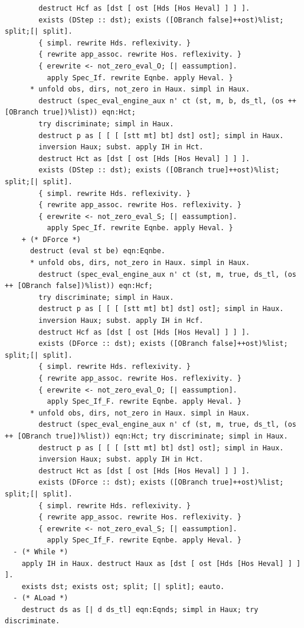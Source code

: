 \documentclass[12pt]{report}
\begin{document}
\begin{verbatim}
        destruct Hcf as [dst [ ost [Hds [Hos Heval] ] ] ].
        exists (DStep :: dst); exists ([OBranch false]++ost)%list; split;[| split].
        { simpl. rewrite Hds. reflexivity. }
        { rewrite app_assoc. rewrite Hos. reflexivity. }
        { erewrite <- not_zero_eval_O; [| eassumption].
          apply Spec_If. rewrite Eqnbe. apply Heval. }
      * unfold obs, dirs, not_zero in Haux. simpl in Haux.
        destruct (spec_eval_engine_aux n' ct (st, m, b, ds_tl, (os ++ [OBranch true])%list)) eqn:Hct;
        try discriminate; simpl in Haux.
        destruct p as [ [ [ [stt mt] bt] dst] ost]; simpl in Haux.
        inversion Haux; subst. apply IH in Hct.
        destruct Hct as [dst [ ost [Hds [Hos Heval] ] ] ].
        exists (DStep :: dst); exists ([OBranch true]++ost)%list; split;[| split].
        { simpl. rewrite Hds. reflexivity. }
        { rewrite app_assoc. rewrite Hos. reflexivity. }
        { erewrite <- not_zero_eval_S; [| eassumption].
          apply Spec_If. rewrite Eqnbe. apply Heval. }
    + (* DForce *)
      destruct (eval st be) eqn:Eqnbe.
      * unfold obs, dirs, not_zero in Haux. simpl in Haux.
        destruct (spec_eval_engine_aux n' ct (st, m, true, ds_tl, (os ++ [OBranch false])%list)) eqn:Hcf;
        try discriminate; simpl in Haux.
        destruct p as [ [ [ [stt mt] bt] dst] ost]; simpl in Haux.
        inversion Haux; subst. apply IH in Hcf.
        destruct Hcf as [dst [ ost [Hds [Hos Heval] ] ] ].
        exists (DForce :: dst); exists ([OBranch false]++ost)%list; split;[| split].
        { simpl. rewrite Hds. reflexivity. }
        { rewrite app_assoc. rewrite Hos. reflexivity. }
        { erewrite <- not_zero_eval_O; [| eassumption].
          apply Spec_If_F. rewrite Eqnbe. apply Heval. }
      * unfold obs, dirs, not_zero in Haux. simpl in Haux.
        destruct (spec_eval_engine_aux n' cf (st, m, true, ds_tl, (os ++ [OBranch true])%list)) eqn:Hct; try discriminate; simpl in Haux.
        destruct p as [ [ [ [stt mt] bt] dst] ost]; simpl in Haux.
        inversion Haux; subst. apply IH in Hct.
        destruct Hct as [dst [ ost [Hds [Hos Heval] ] ] ].
        exists (DForce :: dst); exists ([OBranch true]++ost)%list; split;[| split].
        { simpl. rewrite Hds. reflexivity. }
        { rewrite app_assoc. rewrite Hos. reflexivity. }
        { erewrite <- not_zero_eval_S; [| eassumption].
          apply Spec_If_F. rewrite Eqnbe. apply Heval. }
  - (* While *)
    apply IH in Haux. destruct Haux as [dst [ ost [Hds [Hos Heval] ] ] ].
    exists dst; exists ost; split; [| split]; eauto.
  - (* ALoad *)
    destruct ds as [| d ds_tl] eqn:Eqnds; simpl in Haux; try discriminate.

\end{verbatim}
\end{document}
